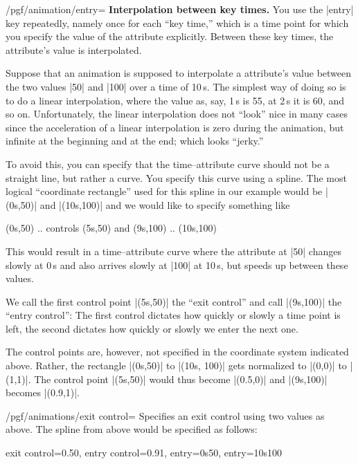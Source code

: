 \begin{key}{/pgf/animation/entry=}
  \medskip
  \textbf{Interpolation between key times.}
  You use the |entry| key repeatedly, namely once for each ``key
  time,'' which is a time point for which you specify the value of the
  attribute explicitly. Between these key times, the attribute's value
  is interpolated.
  
  Suppose that an animation is supposed to interpolate a attribute's
  value between the two values |50| and |100| over a time of
  10\,s. The   simplest way of doing so is to do a linear
  interpolation, where the value as, say, 1\,s is 55, at 2\,s it is
  60, and so on. Unfortunately, the linear interpolation does not
  ``look'' nice in many cases since the acceleration of a linear
  interpolation is zero  during the animation, but infinite at the
  beginning and at the end; which looks ``jerky.''

  To avoid this, you can specify that the time--attribute curve should 
  not be a straight line, but rather a curve. You specify this curve
  using a spline. The most logical ``coordinate rectangle'' used for
  this spline in our example would be |(0s,50)| and |(10s,100)| and we
  would like to specify something like
\begin{codeexample}
  (0s,50) .. controls (5s,50) and (9s,100) .. (10s,100)
\end{codeexample}
  This would result in a time--attribute curve where
  the attribute at |50| changes slowly at 0\,s and also arrives slowly
  at |100| at 10\,s, but speeds up between these values.

  We call the first control point |(5s,50)| the ``exit control'' and
  call |(9s,100)| the ``entry control'': The first control dictates
  how quickly or slowly a time point is left, the second dictates how
  quickly or slowly we enter the next one.

  The control points are, however, not specified in the coordinate
  system indicated above. Rather, the rectangle |(0s,50)| to
  |(10s, 100)| gets normalized to |(0,0)| to |(1,1)|. The control
  point |(5s,50)| would thus become |(0.5,0)| and |(9s,100)| becomes
  |(0.9,1)|. 
  
  \begin{key}{/pgf/animations/exit control=}
    Specifies an exit control using two values as above. The spline
    from above would be specified as follows:

\begin{codeexample}
exit control={0.5}{0},
entry control={0.9}{1},
entry={0s}{50},
entry={10s}{100}
\end{codeexample}


\end{key}
\end{key}
